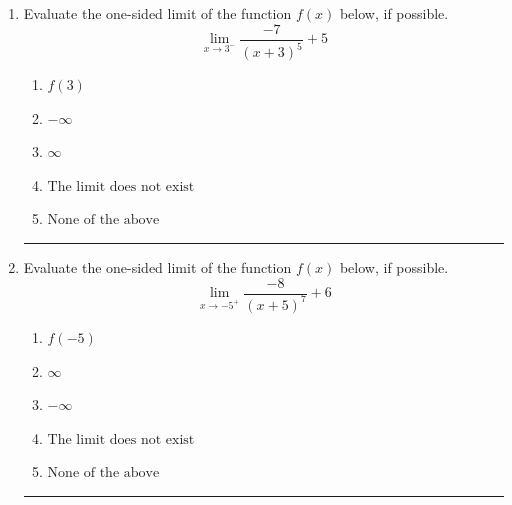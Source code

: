 \documentclass[14pt]{extbook}
\newcommand{\litem}[1]{\item#1\hspace*{-1cm}\rule{\textwidth}{0.4pt}}
\begin{document}
\begin{enumerate}
{\begin{enumerate}[label=\Alph*.]
\end{enumerate} }
\litem{
Evaluate the one-sided limit of the function $f(x)$ below, if possible.\[ \lim_{x \rightarrow 3^-} \frac{-7}{(x+3)^5}+5 \]\begin{enumerate}[label=\Alph*.]
\item \( f(3) \)
\item \( -\infty \)
\item \( \infty \)
\item \( \text{The limit does not exist} \)
\item \( \text{None of the above} \)

\end{enumerate} }
\litem{
Evaluate the one-sided limit of the function $f(x)$ below, if possible.\[ \lim_{x \rightarrow -5^+} \frac{-8}{(x+5)^7}+6 \]\begin{enumerate}[label=\Alph*.]
\item \( f(-5) \)
\item \( \infty \)
\item \( -\infty \)
\item \( \text{The limit does not exist} \)
\item \( \text{None of the above} \)

\end{enumerate} }
\end{enumerate}
\end{document}
